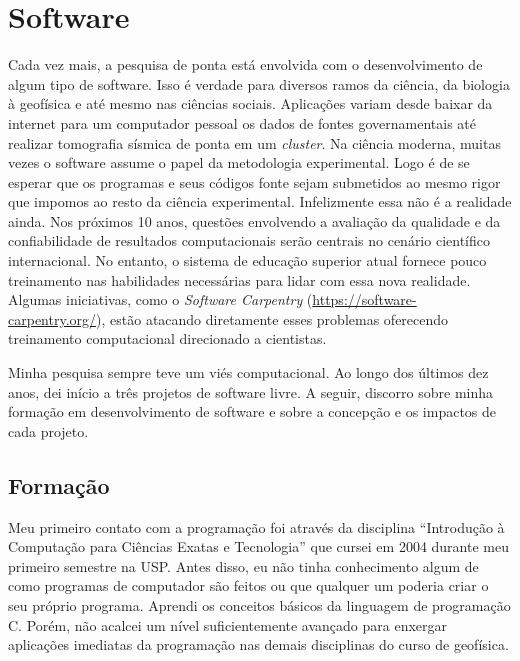 \section{Software}
\label{software}

Cada vez mais, a pesquisa de ponta está envolvida com o desenvolvimento de
algum tipo de software.
Isso é verdade para diversos ramos da ciência, da biologia à geofísica e até
mesmo nas ciências sociais.
Aplicações variam desde baixar da internet para um computador pessoal os dados
de fontes governamentais até realizar tomografia sísmica de ponta em um
\textit{cluster}.
Na ciência moderna, muitas vezes o software assume o papel da metodologia
experimental.
Logo é de se esperar que os programas e seus códigos fonte sejam submetidos
ao mesmo rigor que impomos ao resto da ciência experimental.
Infelizmente essa não é a realidade ainda.
Nos próximos 10 anos, questões envolvendo a avaliação da qualidade e da
confiabilidade de resultados computacionais serão centrais no cenário
científico internacional.
No entanto, o sistema de educação superior atual fornece pouco treinamento nas
habilidades necessárias para lidar com essa nova realidade.
Algumas iniciativas, como o \textit{Software Carpentry}
(\url{https://software-carpentry.org/}), estão atacando diretamente esses
problemas oferecendo treinamento computacional direcionado a cientistas.

Minha pesquisa sempre teve um viés computacional.
Ao longo dos últimos dez anos, dei início a três projetos de software livre.
A seguir, discorro sobre minha formação em desenvolvimento de software e sobre
a concepção e os impactos de cada projeto.


\subsection{Formação}

Meu primeiro contato com a programação foi através da disciplina
``Introdução à Computação para Ciências Exatas e Tecnologia''
que cursei em 2004 durante meu primeiro semestre na USP.
Antes disso, eu não tinha conhecimento algum de como programas de computador
são feitos ou que qualquer um poderia criar o seu próprio programa.
Aprendi os conceitos básicos da linguagem de programação C.
Porém, não acalcei um nível suficientemente avançado para enxergar aplicações
imediatas da programação nas demais disciplinas do curso de geofísica.

